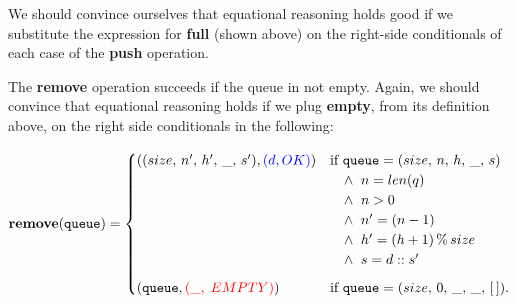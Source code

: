 \documentclass[10pt]{article}
\begin{document}
    We should convince ourselves that equational reasoning holds good if we substitute the expression for \textbf{full} (shown above) on the right-side conditionals of each case of the \textbf{push} operation. 
  
    The \textbf{remove} operation succeeds if the queue in not empty. Again, we should convince that equational reasoning holds if we plug \textbf{empty}, from its definition above, on the right side conditionals in the following: 

    \[
        \mathtt{\mathbf{remove}(queue)} = \begin{cases} ((size,\, n', \, h', \, \_, \, s'), {\textcolor{blue}{(d, OK)}}) & \mbox{if } \mathtt{queue} = (size, \,n, \,h, \,\_,\,s)
        \\& \hspace*{10pt}\wedge \;\; n = len(q)
        \\& \hspace*{10pt}\wedge \;\; n > 0
        \\& \hspace*{10pt}\wedge \;\; n' = (n-1)
        \\& \hspace*{10pt}\wedge \;\; h' = (h + 1) \,\%\, size
        \\& \hspace*{10pt}\wedge \;\; s = d::s' \vspace*{6pt}\\

        (\mathtt{queue},{\textcolor{red}{(\_,\; EMPTY)}})  & \mbox{if }\mathtt{queue} = (size, \,0,\,\_,\, \_,\, [\,]). \end{cases} 
    \]
\end{document}
